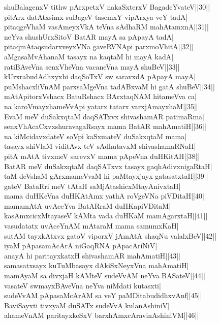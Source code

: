 \documentclass{article}
\begin{document}
shuBalagenxV tithw pArxpetxV nakaSxterxV BagadeYvateV||30||\\
pitArx datAtxsimx suBageV tasemxY vipArxya veY tadA|\\
pitaqgeVhaM vasAmeyxVkA teVna sAdhaRM mahAtamxnA||31||\\
neYva shushUrxSitoV BatAR mayA sa pApayA tadA|\\
pitaqmAtaqsudarxveyxVNa gaveRVNApi parxmoVhitA||32||\\
aMgasaMvAhanaM tasayx na kaqtaM hi mayA kadA|\\
ratiBAveVna senxVheVna vacaneVna mayA shuBeV||33||\\
kUrxrabudAdhxyxhi daqSoTxV sw saravxdA pApayA mayA|\\
puMshacxliVnAM parxsaMgeVna tadABxvaM hi gatA shuBeV||34||\\
mAtApitorxVshacx BatuRshacx BArxtaqNAM hitameVva ca|\\
na karoVmayxhameVvApi yatarx tatarx varxjAmayxhaM||35||\\
EvaM meV duSakxqtaM daqSATxvx shivashamAR patimaRma|\\
senxVhAcaCxvxshuravagaRsayx mama BatAR mahAmatiH||36||\\
na kiMcidavxdateV soVpi kaSxmateV duSakxqtaM mama|\\
tasayx shiVlaM viditAvx teV sAdhutavxM shivashamaRNaH|\\
pitA mAtA tivxmeV sarevxV mama pApeVna duHKitAH||38||\\
BatAR meV duSakxqtaM daqSATxvx tasayx gaqhAdivxnigaRtaH|\\
taM deVshaM gArxmameVvaM hi paMtayxjayx gatasatxtaH||39||\\
gateV BataRri meV tAtaH saMjAtashicxMtayAnivxtaH|\\
mama duHKeVna duHKAtAmx yathA roVgeVNa piVDitaH||40||\\
mamamAtA uvAceYva BatARraM duHKapiVDitaM|\\
kasAmxcicxMtayaseV kAMta vada duHKaM mamAgarxtaH||41||\\
vasudatatx uvAceYnAM mAtaraM mama samumxKaH|\\
sutAM tayxkAtxvx gatoV viporxV jAmAtA shaqNu valalxBeV||42||\\
iyaM pApasamAcArA niGaqRNA pApacAriNiV|\\
anayA hi paritayxkatxH shivashamAR mahAmatiH||43||\\
samasatxsayx kuTuMbasayx dAkiSxNeyxVna mahAmatiH|\\
mamAyaM sa divxjaH kAMteV sudeVvAM neYva BASateV||44||\\
vasateV swmayxBAveVna neYva niMdati kutasxti|\\
sudeVvAM pApasaMcArAM sa veY paMDitabudidhxvAnf||45||\\
BaviSayxti tivxyaM duSATx sudeVvA kulanAshiniV|\\
ahameVnAM paritayxkeSxV barxhAmxcAravinAshiniVM||46||\\
\end{document}
